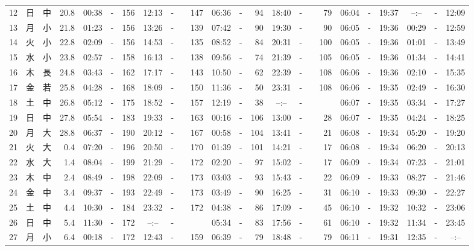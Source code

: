 \documentclass[12pt,a4j]{jsarticle}
\begin{document}
\begin{table}[htbp]
\begin{center}
{\begin{tabular}{|rc|cr|ccrccr|ccrccr|ccc|ccc|}
12 & 日 & 中 & 20.8 &  00:38 &-& 156 &  12:13 &-& 147 &  06:36 &-&  94 &  18:40 &-&  79 & 06:04 & -& 19:37 & --:-- & -& 12:09 \\
13 & 月 & 小 & 21.8 &  01:23 &-& 156 &  13:26 &-& 139 &  07:42 &-&  90 &  19:30 &-&  90 & 06:05 & -& 19:36 & 00:29 & -& 12:59 \\
14 & 火 & 小 & 22.8 &  02:09 &-& 156 &  14:53 &-& 135 &  08:52 &-&  84 &  20:31 &-& 100 & 06:05 & -& 19:36 & 01:01 & -& 13:49 \\
15 & 水 & 小 & 23.8 &  02:57 &-& 158 &  16:13 &-& 138 &  09:56 &-&  74 &  21:39 &-& 105 & 06:05 & -& 19:36 & 01:34 & -& 14:41 \\
16 & 木 & 長 & 24.8 &  03:43 &-& 162 &  17:17 &-& 143 &  10:50 &-&  62 &  22:39 &-& 108 & 06:06 & -& 19:36 & 02:10 & -& 15:35 \\
17 & 金 & 若 & 25.8 &  04:28 &-& 168 &  18:09 &-& 150 &  11:36 &-&  50 &  23:31 &-& 108 & 06:06 & -& 19:35 & 02:49 & -& 16:30 \\
18 & 土 & 中 & 26.8 &  05:12 &-& 175 &  18:52 &-& 157 &  12:19 &-&  38 &  --:-- &-&~~~~~ & 06:07 & -& 19:35 & 03:34 & -& 17:27 \\
19 & 日 & 中 & 27.8 &  05:54 &-& 183 &  19:33 &-& 163 &  00:16 &-& 106 &  13:00 &-&  28 & 06:07 & -& 19:35 & 04:24 & -& 18:25 \\
20 & 月 & 大 & 28.8 &  06:37 &-& 190 &  20:12 &-& 167 &  00:58 &-& 104 &  13:41 &-&  21 & 06:08 & -& 19:34 & 05:20 & -& 19:20 \\
21 & 火 & 大 &  0.4 &  07:20 &-& 196 &  20:50 &-& 170 &  01:39 &-& 101 &  14:21 &-&  17 & 06:08 & -& 19:34 & 06:20 & -& 20:13 \\
22 & 水 & 大 &  1.4 &  08:04 &-& 199 &  21:29 &-& 172 &  02:20 &-&  97 &  15:02 &-&  17 & 06:09 & -& 19:34 & 07:23 & -& 21:01 \\
23 & 木 & 中 &  2.4 &  08:49 &-& 198 &  22:09 &-& 173 &  03:03 &-&  93 &  15:43 &-&  22 & 06:09 & -& 19:33 & 08:27 & -& 21:46 \\
24 & 金 & 中 &  3.4 &  09:37 &-& 193 &  22:49 &-& 173 &  03:49 &-&  90 &  16:25 &-&  31 & 06:10 & -& 19:33 & 09:30 & -& 22:27 \\
25 & 土 & 中 &  4.4 &  10:30 &-& 184 &  23:32 &-& 172 &  04:38 &-&  86 &  17:09 &-&  45 & 06:10 & -& 19:32 & 10:32 & -& 23:06 \\
26 & 日 & 中 &  5.4 &  11:30 &-& 172 &  --:-- &-&~~~~~ &  05:34 &-&  83 &  17:56 &-&  61 & 06:10 & -& 19:32 & 11:34 & -& 23:45 \\
27 & 月 & 小 &  6.4 &  00:18 &-& 172 &  12:43 &-& 159 &  06:39 &-&  79 &  18:48 &-&  79 & 06:11 & -& 19:31 & 12:35 & -& --:-- \\

\end{tabular}}
\end{center}
\end{table}
\end{document}
